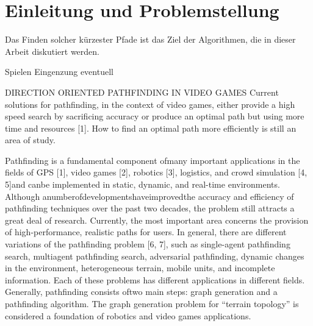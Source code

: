 \chapter{Einleitung und Problemstellung}


Das Finden solcher kürzester Pfade ist das Ziel der Algorithmen, die in dieser Arbeit diskutiert werden.

Spielen Eingenzung eventuell

DIRECTION ORIENTED PATHFINDING IN VIDEO GAMES
Current solutions for pathfinding, in the context of video games, either provide a high speed search by sacrificing accuracy or produce an optimal path but using more time and resources [1]. How to find an optimal path more efficiently is still an area of study.


Pathfinding is a fundamental component ofmany important applications in the fields of GPS [1], video games [2], robotics [3], logistics, and crowd simulation [4, 5]and canbe implemented in static, dynamic, and real-time environments. Although anumberofdevelopmentshaveimprovedthe accuracy and efficiency of pathfinding techniques over the past two decades, the problem still attracts a great deal of research. Currently, the most important area concerns the provision of high-performance, realistic paths for users. In general, there are different variations of the pathfinding problem [6, 7], such as single-agent pathfinding search, multiagent pathfinding search, adversarial pathfinding, dynamic changes in the environment, heterogeneous terrain, mobile units, and incomplete information. Each of these problems has different applications in different fields. Generally, pathfinding consists oftwo main steps: graph generation and a pathfinding algorithm.
The graph generation problem for “terrain topology” is considered a foundation of robotics and video games applications.



